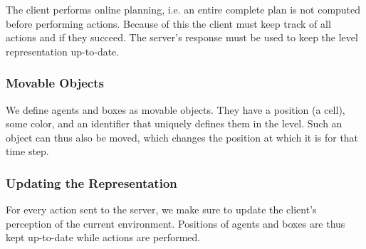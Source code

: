 The client performs online planning, i.e. an entire complete plan is not computed before performing actions.
Because of this the client must keep track of all actions and if they succeed.
The server's response must be used to keep the level representation up-to-date.

\subsubsection{Movable Objects}

We define agents and boxes as movable objects.
They have a position (a cell), some color, and an identifier that uniquely defines them in the level.
Such an object can thus also be moved, which changes the position at which it is for that time step.

\subsubsection{Updating the Representation}

For every action sent to the server, we make sure to update the client's perception of the current environment.
Positions of agents and boxes are thus kept up-to-date while actions are performed.
